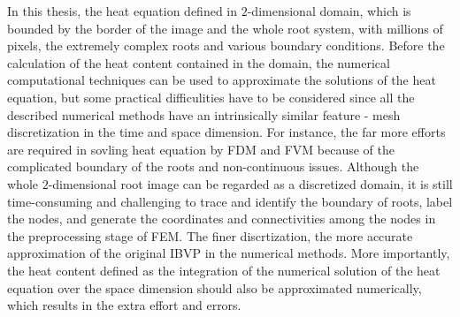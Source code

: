 In this thesis, the heat equation defined in $2$-dimensional domain,
which is bounded by the border of the image and the whole root system,
with millions of pixels, the extremely complex roots and various
boundary conditions. Before the calculation of the heat content
contained in the domain, the numerical computational techniques can be
used to approximate the solutions of the heat equation, but some
practical difficulities have to be considered since all the described
numerical methods have an intrinsically similar feature - mesh
discretization in the time and space dimension. For instance, the far
more efforts are required in sovling heat equation by FDM and FVM
because of the complicated boundary of the roots and non-continuous
issues. Although the whole $2$-dimensional root image can be regarded
as a discretized domain, it is still time-consuming and challenging to
trace and identify the boundary of roots, label the nodes, and
generate the coordinates and connectivities among the nodes in the
preprocessing stage of FEM. The finer discrtization, the more accurate
approximation of the original IBVP in the numerical methods. More
importantly, the heat content defined as the integration of the
numerical solution of the heat equation over the space dimension
should also be approximated numerically, which results in the extra
effort and errors.





